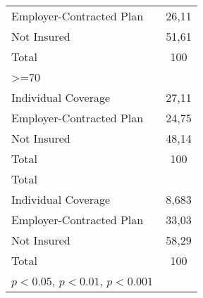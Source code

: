 {\begin{tabular}{l*{2}{c}}
Employer-Contracted Plan&                     &       26,11\sym{***}\\
Not Insured &                     &       51,61\sym{***}\\
Total       &                     &         100         \\
\hline
>=70        &                     &                     \\
Individual Coverage&                     &       27,11\sym{***}\\
Employer-Contracted Plan&                     &       24,75\sym{***}\\
Not Insured &                     &       48,14\sym{***}\\
Total       &                     &         100         \\
\hline
Total       &                     &                     \\
Individual Coverage&                     &       8,683\sym{***}\\
Employer-Contracted Plan&                     &       33,03\sym{***}\\
Not Insured &                     &       58,29\sym{***}\\
Total       &                     &         100         \\
\hline\hline
\multicolumn{3}{l}{\footnotesize \sym{*} \(p<0.05\), \sym{**} \(p<0.01\), \sym{***} \(p<0.001\)}\\
\end{tabular}
}
